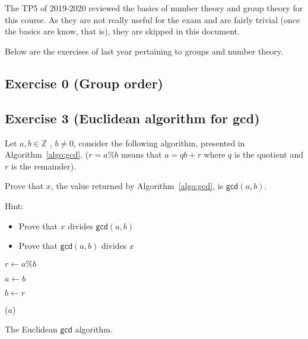 \section{}

The TP5 of 2019-2020 reviewed the basics of number theory and group theory for this course. As they are not really useful for the exam and are fairly trivial (once the basics are know, that is), they are skipped in this document.

Below are the exercises of last year pertaining to groups and number theory.



\subsection{Exercise 0 (Group order)}




\subsection{Exercise 3 (Euclidean algorithm for gcd)}

Let $a,b \in \mathbb{Z}$ , $b \neq 0$, consider the following algorithm, presented in Algorithm~\ref{algo:gcd}. ($r=a \% b$ means that $a=qb+r$ where $q$ is the quotient and $r$ is the remainder).

Prove that $x$, the value returned by Algorithm~\ref{algo:gcd}, is $\mathsf{gcd} (a,b)$.

Hint:
\begin{itemize}
	\item Prove that $x$ divides  $ \mathsf{gcd} (a,b)$
	\item Prove that $ \mathsf{gcd} (a,b)$ divides $x$
\end{itemize}

\begin{algorithm}

	{
		$r \leftarrow a\%b$\;

		$a \leftarrow b$\;

		$b \leftarrow r$\;
	}
	\Return($a$)

	\caption{The Euclidean $\mathsf{gcd}$ algorithm.}\label{algo:gcd}
\end{algorithm}


